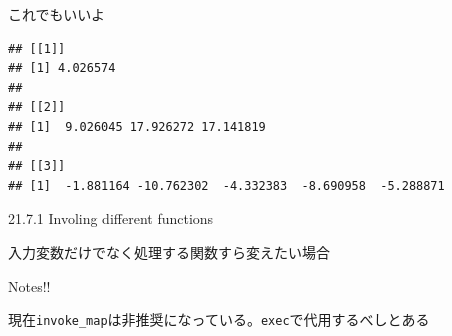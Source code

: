 \documentclass[ignorenonframetext,]{beamer}
\newenvironment{Shaded}{\begin{snugshade}}{\end{snugshade}}
\newcommand{\KeywordTok}[1]{\textcolor[rgb]{0.13,0.29,0.53}{\textbf{#1}}}
\newcommand{\DecValTok}[1]{\textcolor[rgb]{0.00,0.00,0.81}{#1}}
\newcommand{\StringTok}[1]{\textcolor[rgb]{0.31,0.60,0.02}{#1}}
\newcommand{\OperatorTok}[1]{\textcolor[rgb]{0.81,0.36,0.00}{\textbf{#1}}}
\newcommand{\NormalTok}[1]{#1}
\begin{document}
\begin{frame}[fragile]{これでもいいよ}

\begin{Shaded}
\end{Shaded}

\begin{verbatim}
## [[1]]
## [1] 4.026574
## 
## [[2]]
## [1]  9.026045 17.926272 17.141819
## 
## [[3]]
## [1]  -1.881164 -10.762302  -4.332383  -8.690958  -5.288871
\end{verbatim}

\end{frame}

\begin{frame}[fragile]{21.7.1 Involing different functions}

入力変数だけでなく処理する関数すら変えたい場合

\begin{block}{Notes!!}

現在\texttt{invoke\_map}は非推奨になっている。\texttt{exec}で代用するべしとある

\end{block}

\end{frame}
\end{document}
